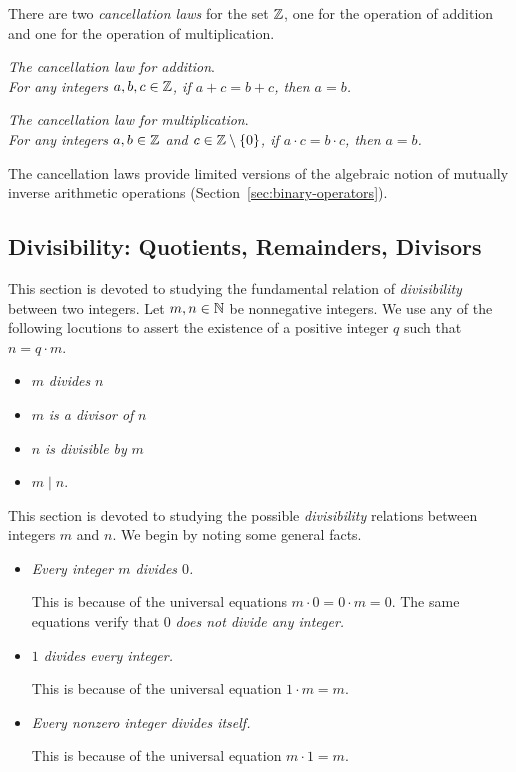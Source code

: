 There are two {\it cancellation laws} for the set $\mathbb{Z}$,
 one for the operation of addition
and one for the operation of multiplication.
\medskip

\noindent
{\it The cancellation law for addition}. \\
%
{\it For any integers $a, b, c \in \mathbb{Z}$, if $a+c = b+c$, then $a = b$.}
\smallskip

\noindent
{\it The cancellation law for multiplication}. \\
%
{\it For any integers $a, b \in \mathbb{Z}$ and $c \in \mathbb{Z} \setminus \{0\}$, if
  $a \cdot c = b \cdot c$, then $a = b$.}
\smallskip

\noindent
The cancellation laws provide limited versions of the algebraic notion
of mutually inverse arithmetic operations
(Section~\ref{sec:binary-operators}).


\subsection{Divisibility: Quotients, Remainders, Divisors}
\label{sec:divisibility}

This section is devoted to studying the fundamental relation of {\em
  divisibility} between two integers.  Let $m, n \in \mathbb{N}$ be
nonnegative integers.  We use any of the following locutions to assert
the existence of a positive integer $q$ such that $n = q \cdot m$.
\begin{itemize}
\item
$m$ {\it divides} $n$
\item
$m$ {\it is a divisor of} $n$
\item
$n$ {\it is divisible by} $m$
\item
$m \mid n$.
\end{itemize}
This section is devoted to studying the possible {\it divisibility}
relations between integers $m$ and $n$.  We begin by noting some
general facts.
\begin{itemize}
\item
{\em Every integer $m$ divides $0$.}

This is because of the universal equations $m \cdot 0 = 0 \cdot m = 0$.  
The same equations verify that $0$ {\em does not divide any integer.}

\item
{\em $1$ divides every integer.}

This is because of the universal equation $1 \cdot m = m$.
\item
{\em Every nonzero integer divides itself.}

This is because of the universal equation $m \cdot 1 = m$.
\end{itemize}

